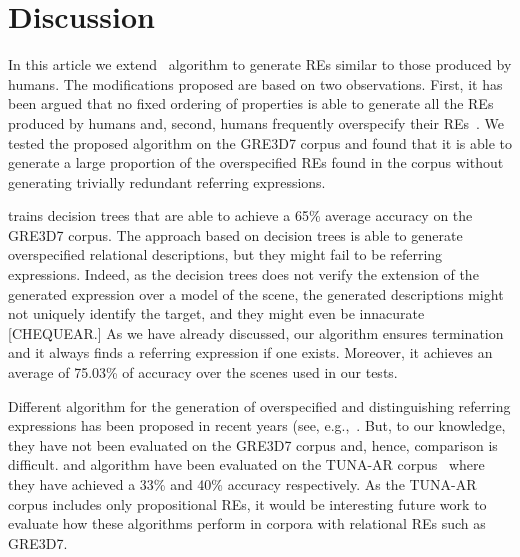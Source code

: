 \section{Discussion} \label{sec:discussion}

In this article we extend~ algorithm to generate REs similar to those produced by humans. The modifications 
proposed are based on two observations. First, it has been argued that no fixed ordering of properties is able to generate all the REs produced by humans and, second, humans frequently overspecify their REs~\cite{Engelhardt_Bailey_Ferreira_2006,Arts_Maes_Noordman_Jansen_2011}. We tested 
the proposed algorithm on the GRE3D7 corpus and found that it is able to generate a large proportion of the overspecified REs found in the corpus without generating trivially redundant referring expressions.

 trains decision trees that are able to achieve a 65\% average accuracy on the GRE3D7 corpus. 
The approach based on decision trees is able to generate overspecified relational descriptions, but they might fail to be referring 
expressions. Indeed, as the decision trees does not verify the extension of the generated expression over a model of the scene, the 
generated descriptions might not uniquely identify the target, and they might even be innacurate [CHEQUEAR.]  As we have already discussed,
our algorithm ensures termination and it always finds a referring expression if one exists.  Moreover, it achieves an average of 75.03\% of accuracy over the scenes used in our tests. 

Different algorithm for the generation of overspecified and distinguishing referring expressions has been proposed in recent years 
(see, e.g.,~\cite{delucena-paraboni:2008:ENLG,ruud-emiel-mariet:2012:INLG2012}.  But, to our knowledge, they have not been evaluated on the 
GRE3D7 corpus and, hence, comparison is difficult.  and  algorithm
have been evaluated on the TUNA-AR corpus~\cite{gatt-balz-kow:2008:ENLG} where they have achieved a 33\% and 40\% accuracy respectively. 
As the TUNA-AR corpus includes only propositional REs, it would be interesting future work to evaluate how these algorithms perform in corpora with relational REs such as GRE3D7. 





